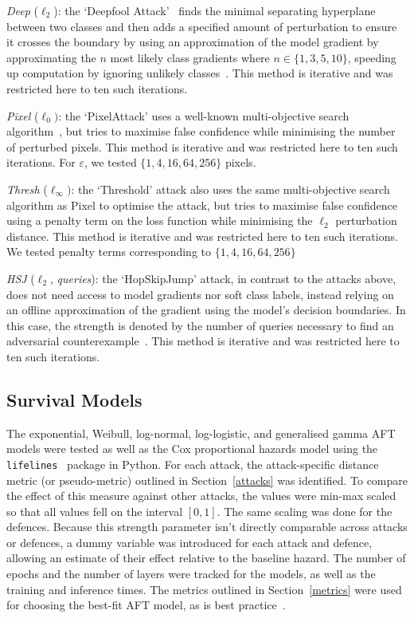 \textit{Deep} ($\ell_2$): the `Deepfool Attack'~\cite{deepfool} finds the minimal separating hyperplane between two classes and then adds a specified amount of perturbation to ensure it crosses the boundary by using an approximation of the model gradient by approximating the $n$ most likely class gradients where $n \in \{1,3,5,10\}$, speeding up computation by ignoring unlikely classes~\cite{deepfool}.
This method is iterative and was restricted here to ten such iterations.

\textit{Pixel} ($\ell_{0})$: the `PixelAttack' uses a well-known multi-objective search algorithm~\cite{pixelattack}, but tries to maximise false confidence while minimising the number of perturbed pixels.
This method is iterative and was restricted here to ten such iterations. For $\varepsilon$, we tested $\{
1,4,16,64,256
\}$ pixels.

\textit{Thresh} ($\ell_{\infty})$: the `Threshold' attack also uses the same multi-objective search algorithm as Pixel to optimise the attack, but tries to maximise false confidence using a penalty term on the loss function while minimising the $\ell_2$ perturbation distance.
This method is iterative and was restricted here to ten such iterations. We tested penalty terms corresponding to $\{ 1,4,16,64,256\}$





\textit{HSJ} ($\ell_2$, \textit{queries}): the `HopSkipJump' attack, in contrast to the attacks above, does not need access to model gradients nor soft class labels, instead relying on an offline approximation of the gradient using the model's decision boundaries.
In this case, the strength is denoted by the number of queries necessary to find an adversarial counterexample~\cite{hopskipjump}.
This method is iterative and was restricted here to ten such iterations.

\subsection{Survival Models}
The exponential, Weibull, log-normal, log-logistic, and generalised gamma  AFT models were tested as well as the Cox proportional hazards model using the \texttt{lifelines}~\cite{lifelines} package in Python.
For each attack, the attack-specific distance metric (or pseudo-metric) outlined in Section~\ref{attacks} was identified.
To compare the effect of this measure against other attacks, the values were min-max scaled so that all values fell on the interval $[0,1]$. The same scaling was done for the defences.
Because this strength parameter isn't directly comparable across attacks or defences, a dummy variable was introduced for each attack and defence, allowing an estimate of their effect relative to the baseline hazard.
The number of epochs and the number of layers were tracked for the models, as well as the training and inference times.
The metrics outlined in Section~\ref{metrics} were used for choosing the best-fit AFT model, as is best practice~\cite{aft_models}.
